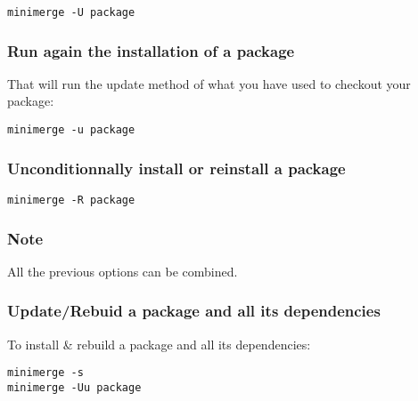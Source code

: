 \documentclass[letterpaper,10pt,english]{sphinxmanual}
\begin{document}
\begin{Verbatim}[commandchars=@\[\]]
minimerge -U package
\end{Verbatim}


\subsubsection{Run again the installation of a package}
\label{usecases/using_minimerge:run-again-the-installation-of-a-package}
That will run the update method of what you have used to checkout your
package:

\begin{Verbatim}[commandchars=@\[\]]
minimerge -u package
\end{Verbatim}


\subsubsection{Unconditionnally install or reinstall a package}
\label{usecases/using_minimerge:unconditionnally-install-or-reinstall-a-package}
\begin{Verbatim}[commandchars=@\[\]]
minimerge -R package
\end{Verbatim}


\subsubsection{Note}
\label{usecases/using_minimerge:note}
All the previous options can be combined.


\subsubsection{Update/Rebuid  a package and all its dependencies}
\label{usecases/using_minimerge:update-rebuid-a-package-and-all-its-dependencies}
To install \& rebuild a package and all its dependencies:

\begin{Verbatim}[commandchars=@\[\]]
minimerge -s
minimerge -Uu package
\end{Verbatim}
\end{document}
